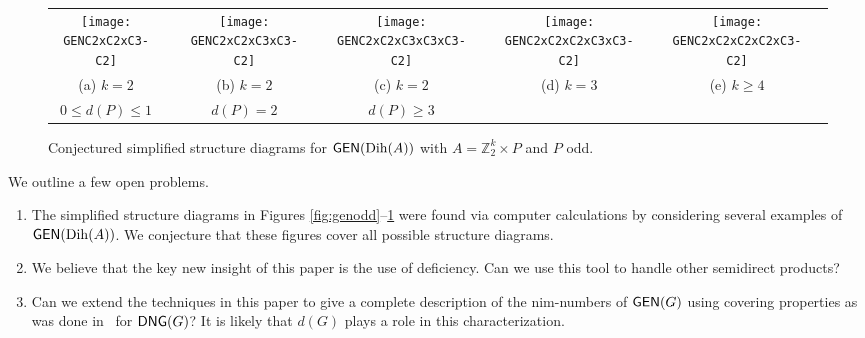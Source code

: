 \documentclass[12pt]{amsart}
\theoremstyle{definition}
\theoremstyle{definition}
\numberwithin{equation}{section}
\begin{document}
\begin{figure}
\begin{tabular}{cccccccccc}
\texttt{[image: GENC2xC2xC3-C2]} &  & \texttt{[image: GENC2xC2xC3xC3-C2]} &  & \texttt{[image: GENC2xC2xC3xC3xC3-C2]} & &
\texttt{[image: GENC2xC2xC2xC3xC3-C2]} &  & \texttt{[image: GENC2xC2xC2xC2xC3-C2]}\tabularnewline
(a) $k=2$          &  & (b) $k=2$  &  & (c) $k=2$ & & (d) $k=3$ &  & (e) $k\ge4$\tabularnewline
$0\le{d}(P)\le1$     &  &     ${d}(P)=2$ &  &     ${d}(P)\ge3$ & \phantom{$\int_a^b$} &  &  &            \tabularnewline
\end{tabular}
\caption{\label{fig:genevenpow23}Conjectured simplified structure diagrams for $\protect{\text{\sf GEN}}(\protect{\operatorname{Dih}}(A))$
with $A=\mathbb{Z}_{2}^{k}\times P$ and $P$ odd.}
\end{figure}

We outline a few open problems.

\begin{enumerate}
\item The simplified structure diagrams in Figures \ref{fig:genodd}--\ref{fig:genevenpow23} were found via computer calculations by
considering several examples of ${\text{\sf GEN}}({\operatorname{Dih}}(A))$. We conjecture that these figures cover all possible structure diagrams.  

\item We believe that the key new insight of this paper is the use of deficiency. Can we use this tool to handle other semidirect products?

\item Can we extend the techniques in this paper to give a complete description of the nim-numbers of ${\text{\sf GEN}}(G)$ using covering properties as was done in~\cite{BeneshErnstSiebenDNG} for ${\text{\sf DNG}}(G)$?
It is likely that $d(G)$ plays a role in this characterization.
\end{enumerate}



\end{document}

